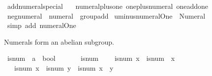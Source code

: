 \begin{isabellebody}
\endisatagproof
{\isafoldproof}%
%
\isadelimproof
\isanewline
%
\endisadelimproof
\isanewline
{}\isamarkupfalse%
\ add{\isacharunderscore}{\kern0pt}numeral{\isacharunderscore}{\kern0pt}special\ {\isacharequal}{\kern0pt}\isanewline
\ \ numeral{\isacharunderscore}{\kern0pt}plus{\isacharunderscore}{\kern0pt}one\ one{\isacharunderscore}{\kern0pt}plus{\isacharunderscore}{\kern0pt}numeral\ one{\isacharunderscore}{\kern0pt}add{\isacharunderscore}{\kern0pt}one\isanewline
\isanewline
{}\isamarkupfalse%
%
\isadelimdocument
%
\endisadelimdocument
%
\isatagdocument
%
\isamarkuptrue%
%
\endisatagdocument
{\isafolddocument}%
%
\isadelimdocument
%
\endisadelimdocument
{}\isamarkupfalse%
\ neg{\isacharunderscore}{\kern0pt}numeral\ {\isacharequal}{\kern0pt}\ numeral\ {\isacharplus}{\kern0pt}\ group{\isacharunderscore}{\kern0pt}add\isanewline
{}\isanewline
\isanewline
{}\isamarkupfalse%
\ uminus{\isacharunderscore}{\kern0pt}numeral{\isacharunderscore}{\kern0pt}One{\isacharcolon}{\kern0pt}\ {\isachardoublequoteopen}{\isacharminus}{\kern0pt}\ Numeral{}\ {\isacharequal}{\kern0pt}\ {\isacharminus}{\kern0pt}\ {}{\isachardoublequoteclose}\isanewline
%
\isadelimproof
\ \ %
\endisadelimproof
%
\isatagproof
{}\isamarkupfalse%
\ {\isacharparenleft}{\kern0pt}simp\ add{\isacharcolon}{\kern0pt}\ numeral{\isacharunderscore}{\kern0pt}One{\isacharparenright}{\kern0pt}%
\endisatagproof
{\isafoldproof}%
%
\isadelimproof
%
\endisadelimproof
%
\begin{isamarkuptext}%
Numerals form an abelian subgroup.%
\end{isamarkuptext}\isamarkuptrue%
\isamarkupfalse%
\ is{\isacharunderscore}{\kern0pt}num\ {\isacharcolon}{\kern0pt}{\isacharcolon}{\kern0pt}\ {\isachardoublequoteopen}{\isacharprime}{\kern0pt}a\ {\isasymRightarrow}\ bool{\isachardoublequoteclose}\isanewline
\ \ \isanewline
\ \ \ \ {\isachardoublequoteopen}is{\isacharunderscore}{\kern0pt}num\ {}{\isachardoublequoteclose}\isanewline
\ \ {\isacharbar}{\kern0pt}\ {\isachardoublequoteopen}is{\isacharunderscore}{\kern0pt}num\ x\ {\isasymLongrightarrow}\ is{\isacharunderscore}{\kern0pt}num\ {\isacharparenleft}{\kern0pt}{\isacharminus}{\kern0pt}\ x{\isacharparenright}{\kern0pt}{\isachardoublequoteclose}\isanewline
\ \ {\isacharbar}{\kern0pt}\ {\isachardoublequoteopen}is{\isacharunderscore}{\kern0pt}num\ x\ {\isasymLongrightarrow}\ is{\isacharunderscore}{\kern0pt}num\ y\ {\isasymLongrightarrow}\ is{\isacharunderscore}{\kern0pt}num\ {\isacharparenleft}{\kern0pt}x\ {\isacharplus}{\kern0pt}\ y{\isacharparenright}{\kern0pt}{\isachardoublequoteclose}\isanewline

\end{isabellebody}
